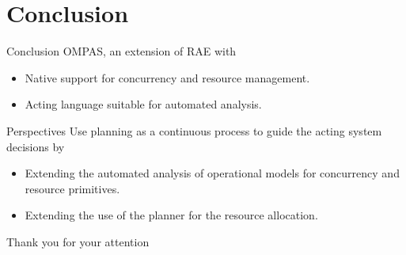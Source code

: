 \section{Conclusion}
\begin{frame}[c]{Conclusion}
    OMPAS, an extension of RAE with
    \begin{itemize}
        \pause
        \item Native support for concurrency and resource management.
        \pause
        \item Acting language suitable for automated analysis.
    \end{itemize}    
\end{frame}

\begin{frame}[c]{Perspectives}
    Use planning as a continuous process to guide the acting system decisions by
    \begin{itemize}
        \pause
        \item Extending the automated analysis of operational models for concurrency and resource primitives.
        \pause
        \item Extending the use of the planner for the resource allocation.
    \end{itemize}
\end{frame}

\begin{frame}
    \LARGE
    \centering
    Thank you for your attention
\end{frame}

